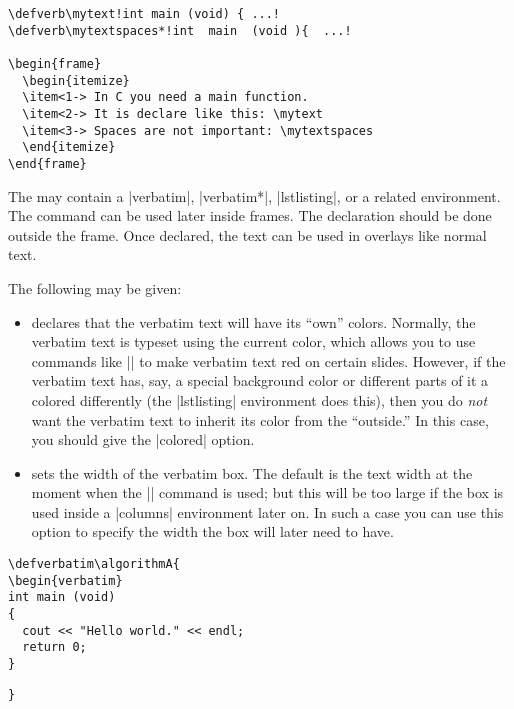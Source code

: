 \begin{frame}
\begin{command}{\opt{|*|}%
    }
\example
\begin{verbatim}
\defverb\mytext!int main (void) { ...!
\defverb\mytextspaces*!int  main  (void ){  ...!

\begin{frame}
  \begin{itemize}
  \item<1-> In C you need a main function.
  \item<2-> It is declare like this: \mytext
  \item<3-> Spaces are not important: \mytextspaces
  \end{itemize}
\end{frame}
\end{verbatim}
\end{command}


\begin{command}{}
  The  may contain a |verbatim|,  |verbatim*|,
  |lstlisting|, or a related environment. The command  can be used later inside frames. The declaration
  should be done outside the frame. Once declared, the text can be
  used in overlays like normal text.

  The following  may be given:
  \begin{itemize}
  \item
     declares that the verbatim text will have
    its ``own'' colors. Normally, the verbatim text is typeset using
    the current color, which allows you to use commands like |\alert|
    to make verbatim text red on certain slides. However, if the
    verbatim text has, say, a special background color or different
    parts of it a colored differently (the |lstlisting| environment
    does this), then you do \emph{not} want the verbatim text to
    inherit its color from the ``outside.'' In this case, you should
    give the |colored| option.
  \item
     sets the width of the verbatim
    box. The default is the text width at the moment when the
    || command is used; but this will be too large if
    the box is used inside a |columns| environment later on. In such a
    case you can use this option to specify the width the box will
    later need to have.
  \end{itemize}  

  \example
\begin{verbatim}
\defverbatim\algorithmA{
\begin{verbatim}
int main (void)
{
  cout << "Hello world." << endl;
  return 0;
}
\end{verbatim}
\unskip{\MacroFont|\end{verbatim}|}
\begin{verbatim}
}


\end{verbatim}
\end{command}
\end{frame}
